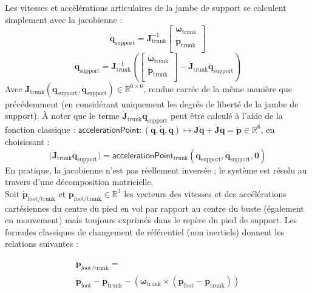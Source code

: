 Les vitesses et accélérations articulaires de la jambe de support se calculent
simplement avec la jacobienne : 
$$
\dot{\bm{q}}_{\text{support}} = \bm{J}_{\text{trunk}}^{-1}
\begin{bmatrix}
    \bm{\omega}_{\text{trunk}} \\
    \bm{\dot{p}}_{\text{trunk}} \\
\end{bmatrix}
$$
$$
\ddot{\bm{q}}_{\text{support}} = \bm{J}_{\text{trunk}}^{-1}\left(
\begin{bmatrix}
    \bm{\dot{\omega}}_{\text{trunk}} \\
    \bm{\ddot{p}}_{\text{trunk}} \\
\end{bmatrix}
-
\bm{\dot{J}}_{\text{trunk}}\dot{\bm{q}}_{\text{support}}
\right)
$$
Avec 
$\bm{\dot{J}}_{\text{trunk}}(\bm{q}_{\text{support}}, \bm{\dot{q}}_{\text{support}}) \in \mathbb{R}^{6 \times 6}$,
rendue carrée de la même manière que précédemment (en considérant uniquement les degrés de liberté de la jambe de support).
À noter que le terme $\bm{\dot{J}}_{\text{trunk}}\dot{\bm{q}}_{\text{support}}$ peut
être calculé à l'aide de la fonction classique : 
$
\mathsf{accelerationPoint} : \left(\bm{q}, \bm{\dot{q}}, \bm{\ddot{q}}\right) 
\longmapsto \bm{J}\bm{\dot{q}}  +\bm{\dot{J}}\bm{\ddot{q}} = \bm{\ddot{p}} \in \mathbb{R}^{6}
$, en choisissant :
$$
\Big(\bm{\dot{J}}_{\text{trunk}}\dot{\bm{q}}_{\text{support}}\Big)
=
\mathsf{accelerationPoint}_{\text{trunk}}(\bm{q}_{\text{support}}, \bm{\dot{q}}_{\text{support}}, \bm{0})
$$
En pratique, la jacobienne n'est pas réellement inversée ; le système est résolu
au travers d'une décomposition matricielle.\\

Soit $\bm{\dot{p}}_{\text{foot/trunk}}$ et $\bm{\ddot{p}}_{\text{foot/trunk}} \in \mathbb{R}^3$
les vecteurs des vitesses et des accélérations cartésiennes du centre du pied en vol 
par rapport au centre du buste (également en mouvement) 
mais toujours exprimés dans le repère du pied de support.
Les formules classiques de changement de référentiel (non inertiels) donnent
les relations suivantes :

\begin{gather*}
\bm{\dot{p}}_{\text{foot/trunk}} = \\
\bm{\dot{p}}_{\text{foot}} 
- \bm{\dot{p}}_{\text{trunk}}
- \left(\bm{\omega}_{\text{trunk}} \times (\bm{p}_{\text{foot}}-\bm{p}_{\text{trunk}})\right)
\end{gather*}

